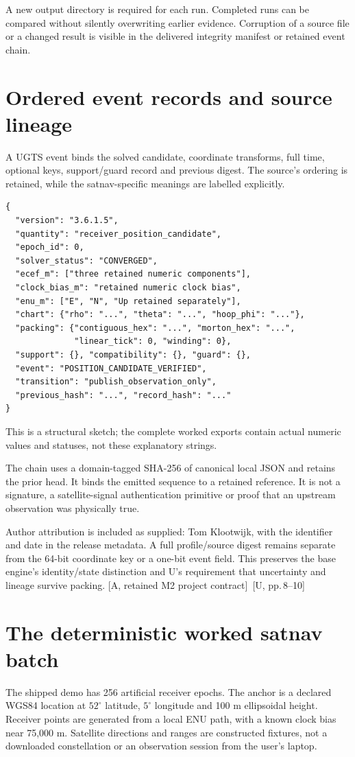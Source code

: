 \documentclass[11pt,a4paper]{article}
\newcommand{\src}[1]{\textcolor{muted}{[U, #1]}}
\newcommand{\base}{\textcolor{muted}{[A, retained M2 project contract]}}
\begin{document}
A new output directory is required for each run. Completed runs can be compared
without silently overwriting earlier evidence. Corruption of a source file or a
changed result is visible in the delivered integrity manifest or retained event chain.
\clearpage

\section{Ordered event records and source lineage}
A UGTS event binds the solved candidate, coordinate transforms, full time, optional
keys, support/guard record and previous digest. The source's ordering is retained,
while the satnav-specific meanings are labelled explicitly.

\begin{lstlisting}
{
  "version": "3.6.1.5",
  "quantity": "receiver_position_candidate",
  "epoch_id": 0,
  "solver_status": "CONVERGED",
  "ecef_m": ["three retained numeric components"],
  "clock_bias_m": "retained numeric clock bias",
  "enu_m": ["E", "N", "Up retained separately"],
  "chart": {"rho": "...", "theta": "...", "hoop_phi": "..."},
  "packing": {"contiguous_hex": "...", "morton_hex": "...",
              "linear_tick": 0, "winding": 0},
  "support": {}, "compatibility": {}, "guard": {},
  "event": "POSITION_CANDIDATE_VERIFIED",
  "transition": "publish_observation_only",
  "previous_hash": "...", "record_hash": "..."
}
\end{lstlisting}
This is a structural sketch; the complete worked exports contain actual numeric
values and statuses, not these explanatory strings.

The chain uses a domain-tagged SHA-256 of canonical local JSON and retains the prior
head. It binds the emitted sequence to a retained reference. It is not a signature,
a satellite-signal authentication primitive or proof that an upstream observation
was physically true.

Author attribution is included as supplied: Tom Klootwijk, with the identifier and
date in the release metadata. A full profile/source digest remains separate from the
64-bit coordinate key or a one-bit event field. This preserves the base engine's
identity/state distinction and U's requirement that uncertainty and lineage survive
packing. \base\ \src{pp.\,8--10}
\clearpage

\section{The deterministic worked satnav batch}
The shipped demo has 256 artificial receiver epochs. The anchor is a declared WGS84
location at $52^\circ$ latitude, $5^\circ$ longitude and 100 m ellipsoidal height.
Receiver points are generated from a local ENU path, with a known clock bias near
75,000 m. Satellite directions and ranges are constructed fixtures, not a downloaded
constellation or an observation session from the user's laptop.
\end{document}
